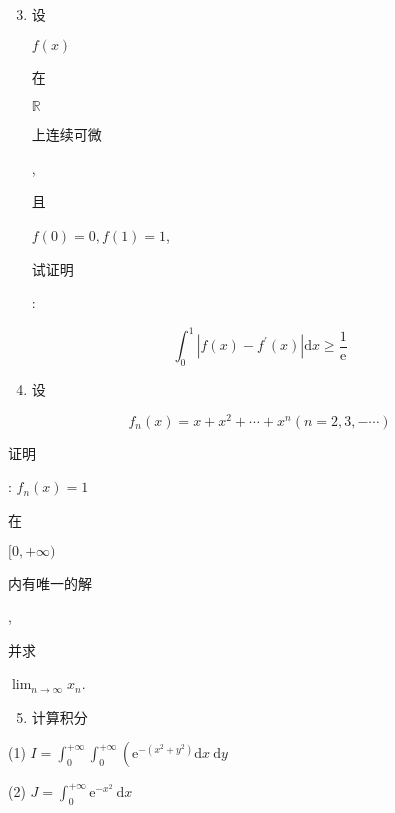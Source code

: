 \documentclass[10pt]{article}
\begin{document}
\begin{enumerate}
  \setcounter{enumi}{2}
  \item \begin{CJK}{UTF8}{mj}设\end{CJK} $f(x)$ \begin{CJK}{UTF8}{mj}在\end{CJK} $\mathbb{R}$ \begin{CJK}{UTF8}{mj}上连续可微\end{CJK}, \begin{CJK}{UTF8}{mj}且\end{CJK} $f(0)=0, f(1)=1$, \begin{CJK}{UTF8}{mj}试证明\end{CJK}:
\end{enumerate}
$$
\int_{0}^{1}\left|f(x)-f^{\prime}(x)\right| \mathrm{d} x \geq \frac{1}{\mathrm{e}}
$$

\begin{enumerate}
  \setcounter{enumi}{3}
  \item \begin{CJK}{UTF8}{mj}设\end{CJK}
\end{enumerate}
$$
f_{n}(x)=x+x^{2}+\cdots+x^{n}(n=2,3,-\cdots)
$$
\begin{CJK}{UTF8}{mj}证明\end{CJK}: $f_{n}(x)=1$ \begin{CJK}{UTF8}{mj}在\end{CJK} $[0,+\infty)$ \begin{CJK}{UTF8}{mj}内有唯一的解\end{CJK}, \begin{CJK}{UTF8}{mj}并求\end{CJK} $\lim _{n \rightarrow \infty} x_{n}$.

\begin{enumerate}
  \setcounter{enumi}{4}
  \item \begin{CJK}{UTF8}{mj}计算积分\end{CJK}
\end{enumerate}
(1) $I=\int_{0}^{+\infty} \int_{0}^{+\infty}\left(\mathrm{e}^{-\left(x^{2}+y^{2}\right)} \mathrm{d} x \mathrm{~d} y\right.$

(2) $J=\int_{0}^{+\infty} \mathrm{e}^{-x^{2}} \mathrm{~d} x$
\end{document}
